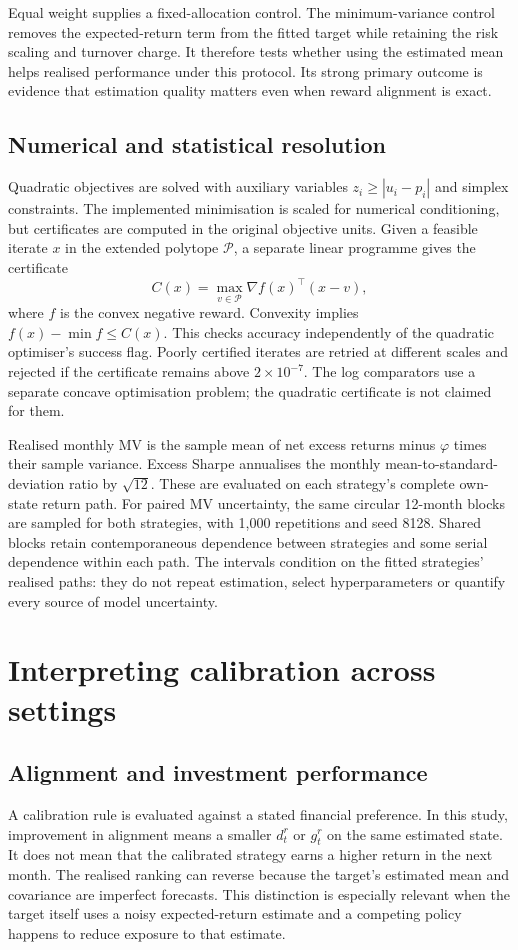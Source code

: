 \documentclass[sigconf,anonymous,review]{acmart}
\begin{document}
Equal weight supplies a fixed-allocation control. The minimum-variance control removes the expected-return term from the fitted target while retaining the risk scaling and turnover charge. It therefore tests whether using the estimated mean helps realised performance under this protocol. Its strong primary outcome is evidence that estimation quality matters even when reward alignment is exact.

\subsection{Numerical and statistical resolution}
Quadratic objectives are solved with auxiliary variables $z_i\ge |u_i-p_i|$ and simplex constraints. The implemented minimisation is scaled for numerical conditioning, but certificates are computed in the original objective units. Given a feasible iterate $x$ in the extended polytope $\mathcal P$, a separate linear programme gives the certificate
\begin{equation}
 C(x)=\max_{v\in\mathcal P}\nabla f(x)^\top(x-v),
\end{equation}
where $f$ is the convex negative reward. Convexity implies $f(x)-\min f\le C(x)$. This checks accuracy independently of the quadratic optimiser's success flag. Poorly certified iterates are retried at different scales and rejected if the certificate remains above $2\times10^{-7}$. The log comparators use a separate concave optimisation problem; the quadratic certificate is not claimed for them.

Realised monthly MV is the sample mean of net excess returns minus $\varphi$ times their sample variance. Excess Sharpe annualises the monthly mean-to-standard-deviation ratio by $\sqrt{12}$. These are evaluated on each strategy's complete own-state return path. For paired MV uncertainty, the same circular 12-month blocks are sampled for both strategies, with 1,000 repetitions and seed 8128. Shared blocks retain contemporaneous dependence between strategies and some serial dependence within each path. The intervals condition on the fitted strategies' realised paths: they do not repeat estimation, select hyperparameters or quantify every source of model uncertainty.

\section{Interpreting calibration across settings}
\subsection{Alignment and investment performance}
A calibration rule is evaluated against a stated financial preference. In this study, improvement in alignment means a smaller $d_t^r$ or $g_t^r$ on the same estimated state. It does not mean that the calibrated strategy earns a higher return in the next month. The realised ranking can reverse because the target's estimated mean and covariance are imperfect forecasts. This distinction is especially relevant when the target itself uses a noisy expected-return estimate and a competing policy happens to reduce exposure to that estimate.
\end{document}
